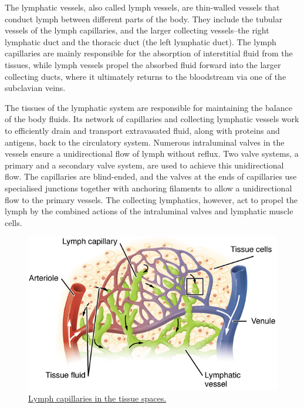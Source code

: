 The lymphatic vessels, also called lymph vessels, are thin-walled vessels that conduct lymph between different parts of the body. They include the tubular vessels of the lymph capillaries, and the larger collecting vessels--the right lymphatic duct and the thoracic duct (the left lymphatic duct). The lymph capillaries are mainly responsible for the absorption of interstitial fluid from the tissues, while lymph vessels propel the absorbed fluid forward into the larger collecting ducts, where it ultimately returns to the bloodstream via one of the subclavian veins.

The tissues of the lymphatic system are responsible for maintaining the balance of the body fluids. Its network of capillaries and collecting lymphatic vessels work to efficiently drain and transport extravasated fluid, along with proteins and antigens, back to the circulatory system. Numerous intraluminal valves in the vessels ensure a unidirectional flow of lymph without reflux. Two valve systems, a primary and a secondary valve system, are used to achieve this unidirectional flow. The capillaries are blind-ended, and the valves at the ends of capillaries use specialised junctions together with anchoring filaments to allow a unidirectional flow to the primary vessels. The collecting lymphatics, however, act to propel the lymph by the combined actions of the intraluminal valves and lymphatic muscle cells.



\begin{figure}

{\centering \includegraphics[width=0.7\linewidth]{./figures/immune/2202_Lymphatic_Capillaries_big} 

}

\caption{\href{https://commons.wikimedia.org/wiki/File:2202_Lymphatic_Capillaries_big.png}{Lymph capillaries in the tissue spaces.}}\label{fig:lymphaticcapillaries}
\end{figure}

